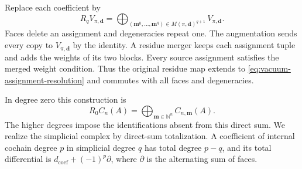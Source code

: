 Replace each coefficient by
\begin{equation}
 R_qV_{\pi,\mathbf d}=
 \bigoplus_{(\mathbf m^0,\ldots,\mathbf m^q)
                  \in M(\pi,\mathbf d)^{q+1}}V_{\pi,\mathbf d}.
 \label{eq:vacuum-assignment-resolution}
\end{equation}
Faces delete an assignment and degeneracies repeat one.  The
augmentation sends every copy to \(V_{\pi,\mathbf d}\) by the
identity.  A residue merger keeps each assignment tuple and adds
the weights of its two blocks.  Every source assignment satisfies
the merged weight condition.  Thus the original residue map
extends to \eqref{eq:vacuum-assignment-resolution} and commutes
with all faces and degeneracies.

In degree zero this construction is
\[
 R_0C_n(A)=\bigoplus_{\mathbf m\in\mathbb N^n}C_{n,\mathbf m}(A).
\]
The higher degrees impose the identifications absent from this
direct sum.  We realize the simplicial complex by direct-sum
totalization.  A coefficient of internal cochain degree \(p\) in
simplicial degree \(q\) has total degree \(p-q\), and its total
differential is \(d_{\mathrm{coef}}+(-1)^p\partial\), where
\(\partial\) is the alternating sum of faces.

